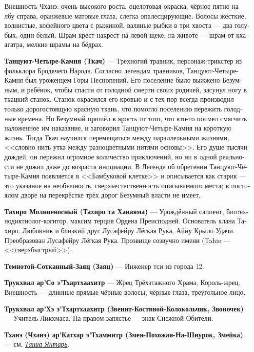 \documentclass[a4paper,12pt,fleqn]{book}\usepackage{polyglossia}\setdefaultlanguage[babelshorthands=true]{russian}\setotherlanguage{english}\defaultfontfeatures{Ligatures=TeX,Mapping=tex-text}\usepackage{xcolor}\newcommand{\ml}[3]{#2}
\newcommand{\theterm}[3]{\textbf{\hypertarget{#1}{#2}} --- #3}
\newcommand{\thesynonim}[3]{\textbf{#2} --- см. \textit{\hyperlink{#1}{#3}}.}
\begin{document}
{{Внешность Чханэ: очень высокого роста, оцелотовая окраска, чёрное пятно на лбу справа, оранжевые матовые глаза, слегка опалесцирующие.
Волосы жёсткие, волнистые, кофейного цвета с рыжиной, валяные рыбки в три хвоста --- два голубых, один белый.
Шрам крест-накрест на левой щеке, на животе --- шрам от кхаагатра, мелкие шрамы на бёдрах.}

\theterm{weaver}
{Танцуют-Четыре-Камня (Ткач)}
{Трёхногий травник, персонаж-трикстер из фольклора Бродячего Народа.
Согласно легендам травников, Танцуют-Четыре-Камня был уроженцем Горы Песнопений.
Его поселение было выжжено Безумным, и ребёнок, чтобы спасти от голодной смерти своих родичей, засунул ногу в ткацкий станок.
Станок окрасился его кровью и с тех пор всегда производил только дорогостоящую красную ткань, что помогло поселению пережить голодные времена.
Но Безумный пришёл в ярость от того, что кто-то посмел смягчить наложенное им наказание, и заговорил Танцуют-Четыре-Камня на короткую жизнь.
Тогда Ткач научился перемещаться между параллельными жизнями, <<словно нить утка между разноцветными нитями основы>>.
Его душе тысячи дождей, он пережил огромное количество приключений, но ни в одной реальности не дожил даже до возраста инициации.
В Легенде об обретении Танцуют-Четыре-Камня появляется в <<Бамбуковой клетке>> и описывается как старик --- это указание на необычность, сверхъестественность описываемого места;
в постоялом дворе на перекрёстке трёх дорог Безумный власти не имеет.}

\theterm{tajiro} %
{Тахиро Молниеносный (Тахиро та Ханаяма)}
{Урождённый сапиент, биотехнодиктиолог-когитор, максим терция Ордена Преисподней.
Основатель клана Тахиро.
Любовник и близкий друг Лусафейру Лёгкая Рука, Айну Крыло Удачи.
Преобразован Лусафейру Лёгкая Рука.
Прозвище созвучно имени (Tahio --- <<сверхбыстрый>>).}

\theterm{hare} %
{Темнотой-Сотканный-Заяц (Заяц)}
{Инженер тси из города 12.}

\theterm{king-priest-trukchual}
{Трукхвал ар’Со э’Тхартхаахитр}
{Жрец Трёхэтажного Храма, Король-жрец.
Внешность --- длинные прямые чёрные волосы, чёрные глаза, треугольное лицо.}

\theterm{teacher-trukchual}
{Трукхвал ар’Хэ э’Тхартхаахитр (Звенит-Костяной-Колокольчик, Звоночек)}
{Учитель Ликхмаса.
На правом запястье --- знак Снежной Обители.}

\thesynonim{chhanei}
{Тханэ (Чханэ) ар’Катхар э’Тхаммитр (Змея-Похожая-На-Шнурок, Змейка)}
{Таниа Янтарь}

}
\end{document}
